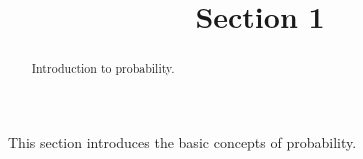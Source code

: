 \documentclass{ximera}
\title{Section 1}
\begin{document}
\begin{abstract}
Introduction to probability.
\end{abstract}
\maketitle

This section introduces the basic concepts of probability.
\end{document}
